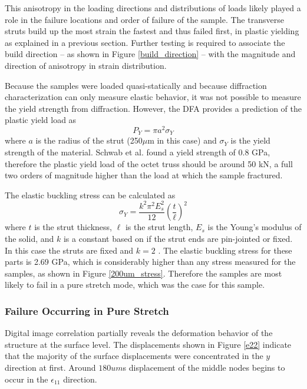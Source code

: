 This anisotropy in the loading directions and distributions of loads likely played a role in the failure locations and order of failure of the sample. The transverse struts build up the most strain the fastest and thus failed first, in plastic yielding as explained in a previous section. Further testing is required to associate the build direction -- as shown in Figure \ref{build_direction} -- with the magnitude and direction of anisotropy in strain distribution. 

Because the samples were loaded quasi-statically and because diffraction characterization can only measure elastic behavior, it was not possible to measure the yield strength from diffraction. However, the DFA provides a prediction of the plastic yield load as
\begin{equation}
	P_Y = \pi a^2\sigma_Y
	\label{yield}
\end{equation}
where $a$ is the radius of the strut (250$\mu$m in this case) and $\sigma_Y$ is the yield strength of the material. Schwab et al. found a yield strength of 0.8 GPa, therefore the plastic yield load of the octet truss should be around 50 kN, a full two orders of magnitude higher than the load at which the sample fractured. 

The elastic buckling stress can be calculated as
\begin{equation}
	\sigma_Y = \frac{k^2\pi^2E_s^2}{12}\left(\frac{t}{\ell}\right)^2
	\label{bucklingstress}
\end{equation}
where $t$ is the strut thickness, $\ell$ is the strut length, $E_s$ is the Young's modulus of the solid, and $k$ is a constant based on if the strut ends are pin-jointed or fixed. In this case the struts are fixed and $k=2$ \cite{Dong2015}. The elastic buckling stress for these parts is 2.69 GPa, which is considerably higher than any stress measured for the samples, as shown in Figure \ref{200um_stress}. Therefore the samples are most likely to fail in a pure stretch mode, which was the case for this sample.

\subsubsection{Failure Occurring in Pure Stretch}
Digital image correlation partially reveals the deformation behavior of the structure at the surface level. The displacements shown in Figure \ref{e22} indicate that the majority of the surface displacements were concentrated in the $y$ direction at first. Around $180um$s displacement of the middle nodes begins to occur in the $\epsilon_{11}$ direction. 

